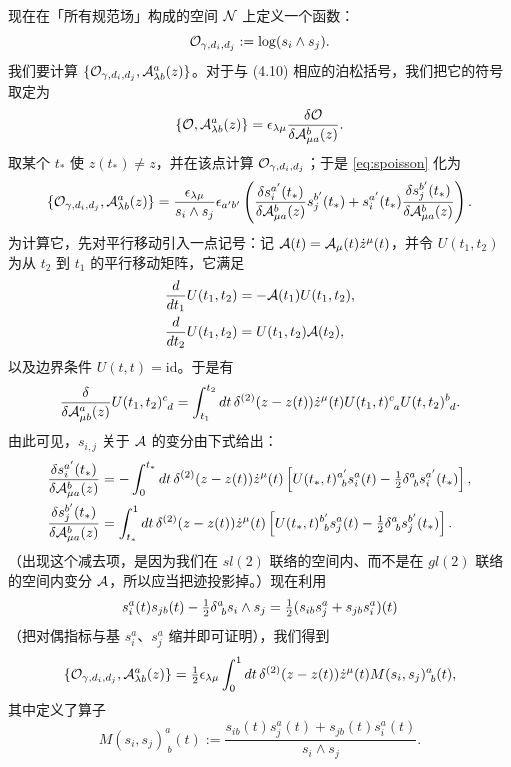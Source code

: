 现在在「所有规范场」构成的空间 $\mathcal{N}$ 上定义一个函数：
\begin{equation}
\mathcal{O}_{\gamma, d_i, d_j}:= \log( s_i \wedge s_j ).
\end{equation}
我们要计算 $\{\mathcal{O}_{\gamma,d_i,d_j},\mathcal{A}^a_{\lambda b}(z)\}$。对于与 (4.10) 相应的泊松括号，我们把它的符号取定为%
\begin{equation} \label{eq:spoisson}
\{ \mathcal{O} ,  \mathcal{A}^a_{\lambda b}(z) \} = \epsilon_{\lambda\mu}
\frac{\delta \mathcal{O}}{\delta \mathcal{A}^b_{\mu a}(z)}.
\end{equation}
取某个 $t_*$ 使 $z(t_*)\neq z$，并在该点计算 $\mathcal{O}_{\gamma,d_i,d_j}$；于是 \eqref{eq:spoisson} 化为
\begin{equation}
\{\mathcal{O}_{\gamma, d_i, d_j}, \mathcal{A}^a_{\lambda b}(z) \}=
\frac{\epsilon_{\lambda\mu} }{s_i\wedge s_j} \epsilon_{a'b'}\left(
\frac{\delta s_i^{a'}(t_*)}{\delta \mathcal{A}^b_{\mu a}(z) } s_j^{b'}(t_*)
+ s_i^{a'}(t_*) \frac{\delta s_j^{b'}(t_*)}{\delta \mathcal{A}^b_{\mu a}(z) } \right).
\end{equation}
为计算它，先对平行移动引入一点记号：记 $\mathcal{A}(t) = \mathcal{A}_\mu(t) \dot z^\mu(t)$，并令 $U(t_1, t_2)$ 为从 $t_2$ 到 $t_1$ 的平行移动矩阵，它满足
\begin{align}
\frac{d}{dt_1} U(t_1,t_2) &= - \mathcal{A}(t_1) U(t_1,t_2), \\
\frac{d}{dt_2} U(t_1,t_2) &= U(t_1,t_2) \mathcal{A}(t_2),
\end{align}
以及边界条件 $U(t,t)=\mathrm{id}$。于是有
\begin{equation}
\frac{\delta}{\delta \mathcal{A}^a_{\mu b}(z)} U(t_1,t_2)^c_{~d} =
\int_{t_1}^{t_2} dt\, \delta^{(2)}(z-z(t)) \dot z^\mu(t)
U(t_1,t)^c_{~a} U(t,t_2)^b_{~d}.
\end{equation}
由此可见，$s_{i,j}$ 关于 $\mathcal{A}$ 的变分由下式给出：
\begin{align}
 \frac{\delta s_i^{a'}(t_*)}{\delta \mathcal{A}^b_{\mu a}(z) } &= - \int_0^{t_*} dt\,
\delta^{(2)}(z-z(t)) \dot z^\mu(t) \left[ U(t_*,t)^{a'}_{~b}
s_i^a(t)- \tfrac{1}{2} \delta^{a}_{~b} s_i^{a'}(t_*) \right], \\
 \frac{\delta s_j^{b'}(t_*)}{\delta \mathcal{A}^b_{\mu a}(z) } &= \int_{t_*}^1 dt\,
\delta^{(2)}(z-z(t)) \dot z^\mu(t) \left[ U(t_*,t)^{b'}_{~b}
s_j^a(t)-\tfrac{1}{2} \delta^{a}_{~b} s_j^{b'}(t_*) \right].
\end{align}
（出现这个减去项，是因为我们在 $sl(2)$ 联络的空间内、而不是在 $gl(2)$ 联络的空间内变分 $\mathcal{A}$，所以应当把迹投影掉。）现在利用
\begin{equation}
\label{eq:rrrng}
 s_i^a(t) s_{jb}(t) - \tfrac{1}{2} \delta^{a}_{~b} s_i \wedge s_j = \tfrac{1}{2}
 (s_{ib} s^a_{j} + s_{jb} s_i^a )(t)
\end{equation}
（把对偶指标与基 $s_i^a$、$s_j^a$ 缩并即可证明），我们得到
\begin{equation}\label{eq:poormandeltaA}
\{\mathcal{O}_{\gamma, d_i, d_j}, \mathcal{A}^a_{\lambda b}(z) \} =  \tfrac{1}{2}
\epsilon_{\lambda\mu}
 \int_{0}^1 dt\, \delta^{(2)}(z-z(t)) \dot z^\mu(t)  M(s_i,s_j)^a_{~b}(t),
\end{equation}
其中定义了算子
\begin{equation}
M(s_i,s_j)^a_{~b}(t) := \frac{s_{ib}(t) s^a_{j}(t) + s_{jb}(t)
s_i^a(t) }{s_i\wedge s_j}.
\end{equation}

